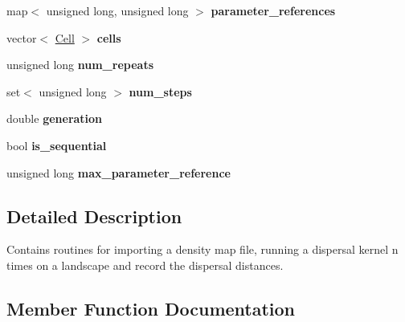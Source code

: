 \begin{DoxyCompactItemize}
\item 
map$<$ unsigned long, unsigned long $>$ {\bfseries parameter\+\_\+references}\hypertarget{class_simulate_dispersal_a9d6fb5998b4b31837ff214b0bd216b18}{}\label{class_simulate_dispersal_a9d6fb5998b4b31837ff214b0bd216b18}

\item 
vector$<$ \hyperlink{struct_cell}{Cell} $>$ {\bfseries cells}\hypertarget{class_simulate_dispersal_abcb3ce61b835cbd007d09726302d692a}{}\label{class_simulate_dispersal_abcb3ce61b835cbd007d09726302d692a}

\item 
unsigned long {\bfseries num\+\_\+repeats}\hypertarget{class_simulate_dispersal_a36ca3df92a79e284cdeb84ea0dfb3c9a}{}\label{class_simulate_dispersal_a36ca3df92a79e284cdeb84ea0dfb3c9a}

\item 
set$<$ unsigned long $>$ {\bfseries num\+\_\+steps}\hypertarget{class_simulate_dispersal_a83c9ad2500bead84ce2d377bc73ae65d}{}\label{class_simulate_dispersal_a83c9ad2500bead84ce2d377bc73ae65d}

\item 
double {\bfseries generation}\hypertarget{class_simulate_dispersal_ae9f8100eaf9faf01a482342f605a8091}{}\label{class_simulate_dispersal_ae9f8100eaf9faf01a482342f605a8091}

\item 
bool {\bfseries is\+\_\+sequential}\hypertarget{class_simulate_dispersal_a72f4b5ec8d52f080f2c9df991fb546ef}{}\label{class_simulate_dispersal_a72f4b5ec8d52f080f2c9df991fb546ef}

\item 
unsigned long {\bfseries max\+\_\+parameter\+\_\+reference}\hypertarget{class_simulate_dispersal_a34ac3bdba52e178538ec92ee08d74c6c}{}\label{class_simulate_dispersal_a34ac3bdba52e178538ec92ee08d74c6c}

\end{DoxyCompactItemize}


\subsection{Detailed Description}
Contains routines for importing a density map file, running a dispersal kernel n times on a landscape and record the dispersal distances. 

\subsection{Member Function Documentation}
